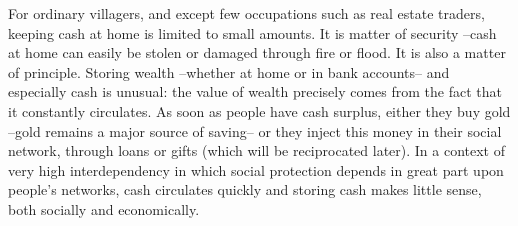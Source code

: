 \documentclass[a4paper, 11pt, onecolumn]{article}
\begin{document}
For ordinary villagers, and except few occupations such as real estate traders, keeping cash at home is limited to small amounts. 
It is matter of security --cash at home can easily be stolen or damaged through fire or flood. 
It is also a matter of principle. 
Storing wealth --whether at home or in bank accounts-- and especially cash is unusual: the value of wealth precisely comes from the fact that it constantly circulates. 
As soon as people have cash surplus, either they buy gold --gold remains a major source of saving-- or they inject this money in their social network, through loans or gifts (which will be reciprocated later). 
In a context of very high interdependency in which social protection depends in great part upon people's networks, cash circulates quickly and storing cash makes little sense, both socially and economically. 
\end{document}
